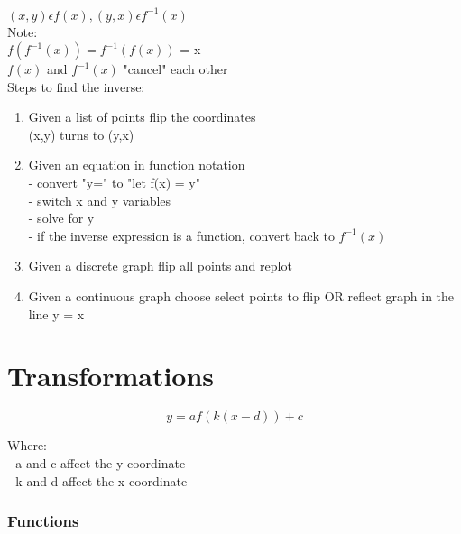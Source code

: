 \documentclass{article}
\begin{document}
$(x,y) \epsilon f(x), (y,x) \epsilon f^{-1}(x)$\\

\noindent
Note:\\
$f(f^{-1}(x)) = f^{-1}(f(x))$ = x\\
$f(x)$ and $f^{-1}(x)$ "cancel" each other\\

\noindent
Steps to find the inverse:
\begin{enumerate}
    \item Given a list of points flip the coordinates\\
        (x,y) turns to (y,x)
    \item Given an equation in function notation\\
        - convert "y=" to "let f(x) = y"\\
        - switch x and y variables\\
        - solve for y\\
        - if the inverse expression is a function, convert back to $f^{-1}(x)$
    \item Given a discrete graph flip all points and replot
    \item Given a continuous graph choose select points to flip OR reflect graph in the line y = x
\end{enumerate} 


\newpage
\section{Transformations}

    \[ y = af(k(x-d))+c \]

    \noindent
    Where:\\
    - a and c affect the y-coordinate\\
    - k and d affect the x-coordinate

    \subsubsection*{Functions}
\end{document}

